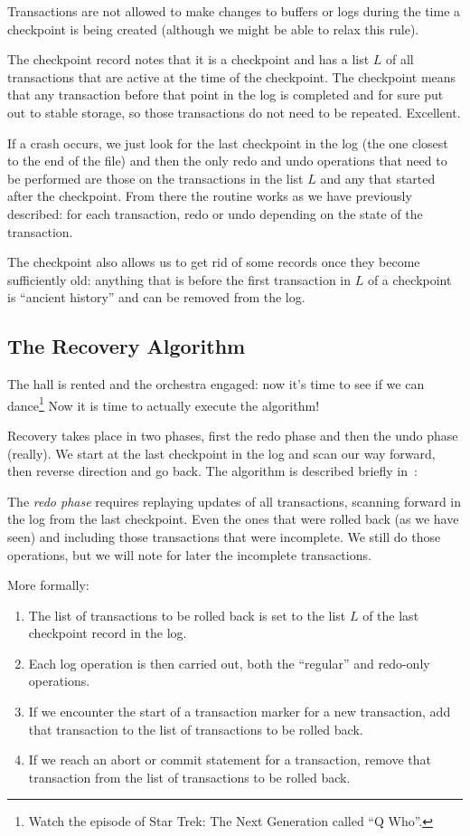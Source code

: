 Transactions are not allowed to make changes to buffers or logs during the time a checkpoint is being created (although we might be able to relax this rule).

The checkpoint record notes that it is a checkpoint and has a list $L$ of all transactions that are active at the time of the checkpoint. The checkpoint means that any transaction before that point in the log is completed and for sure put out to stable storage, so those transactions do not need to be repeated. Excellent.

If a crash occurs, we just look for the last checkpoint in the log (the one closest to the end of the file) and then the only redo and undo operations that need to be performed are those on the transactions in the list $L$ and any that started after the checkpoint. From there the routine works as we have previously described: for each transaction, redo or undo depending on the state of the transaction.

The checkpoint also allows us to get rid of some records once they become sufficiently old: anything that is before the first transaction in $L$ of a checkpoint is ``ancient history'' and can be removed from the log.

\subsection*{The Recovery Algorithm}

The hall is rented and the orchestra engaged: now it's time to see if we can dance\footnote{Watch the episode of Star Trek: The Next Generation called ``Q Who''.} Now it is time to actually execute the algorithm! 

Recovery takes place in two phases, first the redo phase and then the undo phase (really). We start at the last checkpoint in the log and scan our way forward, then reverse direction and go back. The algorithm is described briefly in~\cite{dsc}:

The \textit{redo phase} requires replaying updates of all transactions, scanning forward in the log from the last checkpoint. Even the ones that were rolled back (as we have seen) and including those transactions that were incomplete. We still do those operations, but we will note for later the incomplete transactions. 

More formally:

\begin{enumerate}
	\item The list of transactions to be rolled back is set to the list $L$ of the last checkpoint record in the log.
	\item Each log operation is then carried out, both the ``regular'' and redo-only operations.
	\item If we encounter the start of a transaction marker for a new transaction, add that transaction to the list of transactions to be rolled back.
	\item If we reach an abort or commit statement for a transaction, remove that transaction from the list of transactions to be rolled back.
\end{enumerate}

